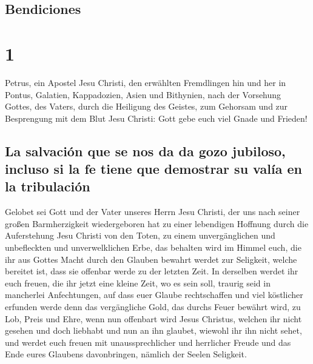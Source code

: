 \hypertarget{bendiciones}{%
\subsection{Bendiciones}\label{bendiciones}}

\hypertarget{section}{%
\section{1}\label{section}}

 Petrus, ein Apostel Jesu Christi, den erwählten
Fremdlingen hin und her in Pontus, Galatien, Kappadozien, Asien und
Bithynien,  nach der Vorsehung Gottes, des Vaters, durch
die Heiligung des Geistes, zum Gehorsam und zur Besprengung mit dem Blut
Jesu Christi: Gott gebe euch viel Gnade und Frieden!

\hypertarget{la-salvaciuxf3n-que-se-nos-da-da-gozo-jubiloso-incluso-si-la-fe-tiene-que-demostrar-su-valuxeda-en-la-tribulaciuxf3n}{%
\subsection{La salvación que se nos da da gozo jubiloso, incluso si la
fe tiene que demostrar su valía en la
tribulación}\label{la-salvaciuxf3n-que-se-nos-da-da-gozo-jubiloso-incluso-si-la-fe-tiene-que-demostrar-su-valuxeda-en-la-tribulaciuxf3n}}

 Gelobet sei Gott und der Vater unseres Herrn Jesu
Christi, der uns nach seiner großen Barmherzigkeit wiedergeboren hat zu
einer lebendigen Hoffnung durch die Auferstehung Jesu Christi von den
Toten,  zu einem unvergänglichen und unbefleckten und
unverwelklichen Erbe, das behalten wird im Himmel  euch,
die ihr aus Gottes Macht durch den Glauben bewahrt werdet zur Seligkeit,
welche bereitet ist, dass sie offenbar werde zu der letzten Zeit.
 In derselben werdet ihr euch freuen, die ihr jetzt eine
kleine Zeit, wo es sein soll, traurig seid in mancherlei Anfechtungen,
 auf dass euer Glaube rechtschaffen und viel köstlicher
erfunden werde denn das vergängliche Gold, das durchs Feuer bewährt
wird, zu Lob, Preis und Ehre, wenn nun offenbart wird Jesus Christus,
 welchen ihr nicht gesehen und doch liebhabt und nun an
ihn glaubet, wiewohl ihr ihn nicht sehet, und werdet euch freuen mit
unaussprechlicher und herrlicher Freude  und das Ende
eures Glaubens davonbringen, nämlich der Seelen Seligkeit.

